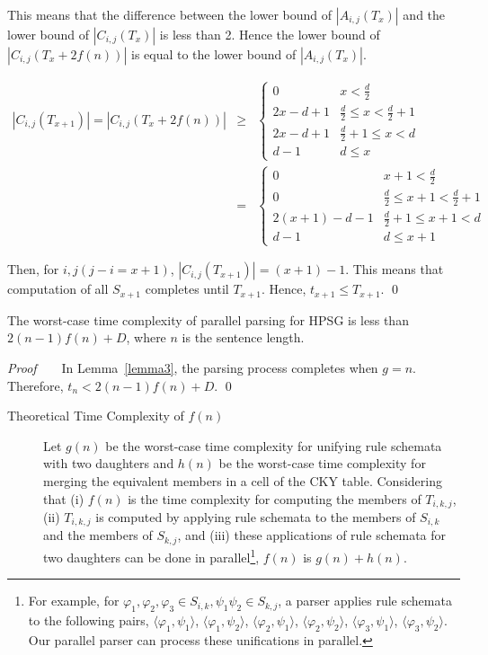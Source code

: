 \begin{description}
This means that the difference between the lower bound of
$|A_{i,j}(T_x)|$ and the lower bound of $|C_{i,j}(T_x)|$ is less than
2.  Hence the lower bound of $|C_{i,j}(T_x+2f(n))|$ is equal to the
lower bound of $|A_{i,j}(T_x)|$.

\begin{eqnarray*}
|C_{i,j}(T_{x+1})| = |C_{i,j}(T_{x}+2f(n))| & \geq &
\left\{
\begin{array}{ll}
0		& x < \frac{d}{2}\\
2x-d+1		& \frac{d}{2} \leq x < \frac{d}{2} + 1\\
2x-d+1		& \frac{d}{2}+1 \leq x < d\\
d-1		& d \leq x
\end{array}
\right.\\
& = &
\left\{
\begin{array}{ll}
0		& x + 1< \frac{d}{2}\\
0		& \frac{d}{2} \leq x + 1 < \frac{d}{2} + 1\\
2(x + 1)-d-1	& \frac{d}{2}+1 \leq x + 1< d\\
d-1		& d \leq x + 1
\end{array}
\right.
\end{eqnarray*}

 Then, for $i,j(j - i = x+1)$, $|C_{i,j}(T_{x+1})| = (x + 1) - 1$.  This
means that computation of all $S_{x+1}$ completes until $T_{x+1}$.
Hence, $t_{x+1} \leq T_{x+1}$. \qed

\end{description}

\begin{lemma}\label{lemma4} The worst-case time complexity of parallel parsing for HPSG is less than $2(n-1)f(n) +D$, where $n$ is the sentence length.
\end{lemma}

{\it Proof} ~ ~ In Lemma~\ref{lemma3}, the parsing process completes when $g =
n$.  Therefore,
$t_n < 2(n-1)f(n) +D$. \qed


\begin{description}
\item [Theoretical Time Complexity of $f(n)$] Let $g(n)$ be the
worst-case time complexity for unifying rule schemata with two
daughters and $h(n)$ be the worst-case time complexity for merging the
equivalent members in a cell of the CKY table.  Considering that (i)
$f(n)$ is the time complexity for computing the members of
$T_{i,k,j}$, (ii) $T_{i,k,j}$ is computed by applying rule schemata to
the members of $S_{i,k}$ and the members of $S_{k,j}$, and (iii) these
applications of rule schemata for two daughters can be done in
parallel\footnote{For example, for $\varphi_1, \varphi_2, \varphi_3
\in S_{i,k}, \psi_1 \psi_2 \in S_{k,j}$, a parser applies rule
schemata to the following pairs, $\langle \varphi_1, \psi_1 \rangle$,
$\langle \varphi_1, \psi_2 \rangle$, $\langle \varphi_2, \psi_1
\rangle$, $\langle \varphi_2, \psi_2 \rangle$, $\langle \varphi_3,
\psi_1 \rangle$, $\langle \varphi_3, \psi_2 \rangle$.  Our parallel
parser can process these unifications in parallel.}, $f(n)$ is $g(n) +
h(n)$.
\end{description}

